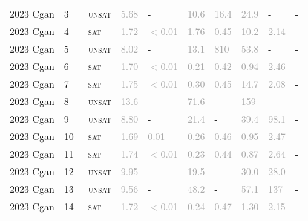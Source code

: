 \begin{center}
{\begin{longtable}{@{}llllllllll@{}}
2023 Cgan & 3 & ~\textsc{unsat} & \textcolor{darkgray}{5.68} & - & \textcolor{darkgray}{10.6} & \textcolor{darkgray}{16.4} & \textcolor{darkgray}{24.9} & - & - \\
2023 Cgan & 4 & ~\textsc{sat} & \textcolor{darkgray}{1.72} & \textcolor{darkgray}{$<$0.01} & \textcolor{darkgray}{1.76} & \textcolor{darkgray}{0.45} & \textcolor{darkgray}{10.2} & \textcolor{darkgray}{2.14} & - \\
2023 Cgan & 5 & ~\textsc{unsat} & \textcolor{darkgray}{8.02} & - & \textcolor{darkgray}{13.1} & \textcolor{darkgray}{810} & \textcolor{darkgray}{53.8} & - & - \\
2023 Cgan & 6 & ~\textsc{sat} & \textcolor{darkgray}{1.70} & \textcolor{darkgray}{$<$0.01} & \textcolor{darkgray}{0.21} & \textcolor{darkgray}{0.42} & \textcolor{darkgray}{0.94} & \textcolor{darkgray}{2.46} & - \\
2023 Cgan & 7 & ~\textsc{sat} & \textcolor{darkgray}{1.75} & \textcolor{darkgray}{$<$0.01} & \textcolor{darkgray}{0.30} & \textcolor{darkgray}{0.45} & \textcolor{darkgray}{14.7} & \textcolor{darkgray}{2.08} & - \\
2023 Cgan & 8 & ~\textsc{unsat} & \textcolor{darkgray}{13.6} & - & \textcolor{darkgray}{71.6} & - & \textcolor{darkgray}{159} & - & - \\
2023 Cgan & 9 & ~\textsc{unsat} & \textcolor{darkgray}{8.80} & - & \textcolor{darkgray}{21.4} & - & \textcolor{darkgray}{39.4} & \textcolor{darkgray}{98.1} & - \\
2023 Cgan & 10 & ~\textsc{sat} & \textcolor{darkgray}{1.69} & \textcolor{darkgray}{0.01} & \textcolor{darkgray}{0.26} & \textcolor{darkgray}{0.46} & \textcolor{darkgray}{0.95} & \textcolor{darkgray}{2.47} & - \\
2023 Cgan & 11 & ~\textsc{sat} & \textcolor{darkgray}{1.74} & \textcolor{darkgray}{$<$0.01} & \textcolor{darkgray}{0.23} & \textcolor{darkgray}{0.44} & \textcolor{darkgray}{0.87} & \textcolor{darkgray}{2.64} & - \\
2023 Cgan & 12 & ~\textsc{unsat} & \textcolor{darkgray}{9.95} & - & \textcolor{darkgray}{19.5} & - & \textcolor{darkgray}{30.0} & \textcolor{darkgray}{28.0} & - \\
2023 Cgan & 13 & ~\textsc{unsat} & \textcolor{darkgray}{9.56} & - & \textcolor{darkgray}{48.2} & - & \textcolor{darkgray}{57.1} & \textcolor{darkgray}{137} & - \\
2023 Cgan & 14 & ~\textsc{sat} & \textcolor{darkgray}{1.72} & \textcolor{darkgray}{$<$0.01} & \textcolor{darkgray}{0.24} & \textcolor{darkgray}{0.47} & \textcolor{darkgray}{1.30} & \textcolor{darkgray}{2.15} & - \\

\end{longtable}}
\end{center}
